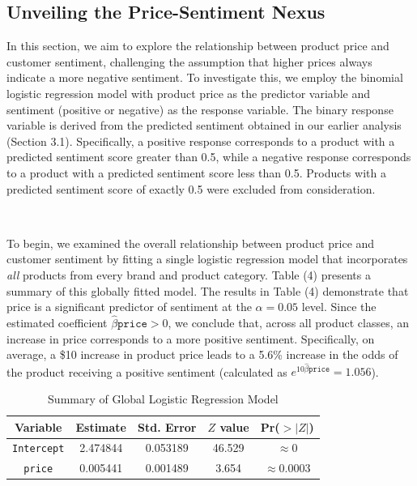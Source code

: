 \documentclass[10pt]{article}
\begin{document}
\subsection{Unveiling the Price-Sentiment Nexus}

In this section, we aim to explore the relationship between product price and customer sentiment, challenging the assumption that higher prices always indicate a more negative sentiment. To investigate this, we employ the binomial logistic regression model with product price as the predictor variable and sentiment (positive or negative) as the response variable. The binary response variable is derived from the predicted sentiment obtained in our earlier analysis (Section 3.1). Specifically, a positive response corresponds to a product with a predicted sentiment score greater than 0.5, while a negative response corresponds to a product with a predicted sentiment score less than 0.5. Products with a predicted sentiment score of exactly 0.5 were excluded from consideration.

\

To begin, we examined the overall relationship between product price and customer sentiment by fitting a single logistic regression model that incorporates \textit{all} products from every brand and product category. Table (4) presents a summary of this globally fitted model. The results in Table (4) demonstrate that price is a significant predictor of sentiment at the $\alpha=0.05$ level. Since the estimated coefficient $\hat{\beta}{\texttt{price}}>0$, we conclude that, across all product classes, an increase in price corresponds to a more positive sentiment. Specifically, on average, a \$10 increase in product price leads to a 5.6\% increase in the odds of the product receiving a positive sentiment (calculated as $e^{10\hat{\beta}{\texttt{price}}} = 1.056$).


\begin{table}[h!]
    \centering
    \begin{tabular}{| c | c | c | c | c |} 
    \hline
    \textbf{Variable} &  \textbf{Estimate} &  \textbf{Std. Error} &  \textbf{$Z$ value} &  \textbf{Pr($>|Z|$)} \\ 
    \hline
    \hline
    \texttt{Intercept} & 2.474844 & 0.053189 & 46.529  & $\approx 0$\\
    \hline
    \texttt{price} & 0.005441 &  0.001489 & 3.654 & $\approx 0.0003$ \\
    \hline  
    \end{tabular}
    \caption{Summary of Global Logistic Regression Model}
\end{table}
\end{document}
